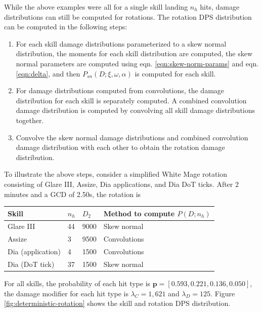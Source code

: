 \documentclass{article}
\begin{document}
   While the above examples were all for a single skill landing $n_h$ hits, damage distributions can still be computed for rotations. The rotation DPS distribution can be computed in the following steps:
    \begin{enumerate}
        \item For each skill damage distributions parameterized to a skew normal distribution, the moments for each skill distribution are computed, the skew normal parameters are computed using eqn. \ref{eqn:skew-norm-params} and eqn. \ref{eqn:delta}, and then $P_{sn}(D; \xi, \omega, \alpha)$ is computed for each skill.
        \item For damage distributions computed from convolutions, the damage distribution for each skill is separately computed. A combined convolution damage distribution is computed by convolving all skill damage distributions together.
        \item Convolve the skew normal damage distributions and combined convolution damage distribution with each other to obtain the rotation damage distribution.
    \end{enumerate}    
    To illustrate the above steps, consider a simplified White Mage rotation consisting of Glare III, Assize, Dia applications, and Dia DoT ticks. After 2 minutes and a GCD of 2.50s, the rotation is
    \begin{table}[H]
        \centering
        \begin{tabular}{@{}llll@{}}
        \toprule
        Skill              & $n_h$ & $D_2$  & Method to compute $P(D;n_h)$  \\ \midrule
        Glare III          & 44    & 9000   & Skew normal   \\
        Assize             & 3     & 9500   & Convolutions  \\
        Dia (application)  & 4     & 1500   & Convolutions  \\
        Dia (DoT tick)     & 37    & 1500   & Skew normal   \\ \bottomrule
        \end{tabular}
        \end{table}
    For all skills, the probability of each hit type is $\textbf{p} = [0.593, 0.221, 0.136, 0.050]$, the damage modifier for each hit type is $\lambda_C = 1,621$ and $\lambda_D = 125$. Figure \ref{fig:deterministic-rotation} shows the skill and rotation DPS distribution.
\end{document}
